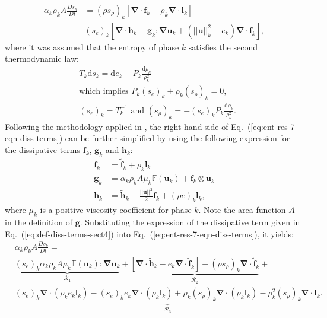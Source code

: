 \documentclass[preprint,10pt]{elsarticle}
\renewcommand{\div}{\mbold{\nabla}\! \cdot \!}
\newcommand{\grad}{\mbold{\nabla}}
\newcommand{\mbold}[1]{\boldsymbol#1}
\newcommand{\eqt}[1]{Eq.~(\ref{#1})}                     %
\begin{document}
%
\begin{align}\label{eq:ent-res-7-eqn-diss-terms}
\alpha_k \rho_k A \frac{Ds_k}{Dt} &=  (\rho s_\rho)_k \left[ \div \mbold f_k - \rho_k \div \mbold l_k \right] + \nonumber \\
&\left(s_e\right)_k \left[ \div \mbold h_k + \mbold g_k : \grad \mbold u_k +  \left( || \mbold u ||^2_k - e_k\right) \div \mbold f_k  \right],
\end{align}
%
where it was assumed that the entropy of phase $k$ satisfies the second thermodynamic law: 
%
\begin{align}\label{eq:2nd-therm-laws-sect4}
&T_k \text{d} s_k = \text{d}e_k - P_k\frac{\text{d}\rho_k}{\rho_k^2} \nonumber \\
& \text{which implies } P_k (s_e)_k + \rho_k (s_\rho)_k = 0, \\
& (s_e)_k = T_k^{-1} \text{ and } (s_\rho)_k = - (s_e)_k P_k \frac{\text{d}\rho_k}{\rho_k^2}. \nonumber
\end{align}
% 
Following the methodology applied in \cite{jlg, Marco_paper_low_mach}, the right-hand side of \eqt{eq:ent-res-7-eqn-diss-terms} can be further simplified by using the following expression
for the dissipative terms $\mbold f_k$,  $\mbold g_k$ and $\mbold h_k$:
%
\begin{subequations}\label{eq:def-diss-terms-sect4}
\begin{align}
  \mbold f_k &= \tilde{\mbold f}_k + \rho_k \mbold  l_k 
  \\
  \mbold g_k &= \alpha_k \rho_k A \mu_k \mathbb{F}(\mbold u_k) + \mbold f_k \otimes \mbold u_k
  \\
  \mbold h_k &= \tilde{\mbold h}_k - \frac{|| \mbold u||^2 }{2} \mbold f_k + (\rho e)_k \mbold l_k,
\end{align}
\end{subequations}
%
where $\mu_k$ is a positive viscosity coefficient for phase $k$. Note the area function $A$ in the definition of $\mbold g$. Substituting the expression of the dissipative term given in \eqt{eq:def-diss-terms-sect4} into \eqt{eq:ent-res-7-eqn-diss-terms}, it yields:
%
\begin{align}\label{eq:ent-res-7-eqn-diss-terms2}
&\alpha_k \rho_k A \frac{Ds_k}{Dt} = \nonumber \\
&\underbrace{\left(s_e\right)_k \alpha_k \rho_k A \mu_k \mathbb{F}(\mbold u_k) : \grad \mbold u_k}_{\mathcal{R}_1} +
\underbrace{\left[ \div \tilde{\mbold h}_k  - e_k \div \tilde{\mbold f}_k  \right] + (\rho s_\rho)_k \div \tilde{\mbold f}_k}_{\mathcal{R}_2} + \nonumber \\
&\underbrace{(s_e)_k \div \left( \rho_k e_k \mbold l_k \right) -  (s_e)_k e_k \div \left( \rho_k \mbold l_k \right) + \rho_k (s_\rho)_k \div \left( \rho_k \mbold l_k \right) 
  - \rho_k^2 (s_\rho)_k \div \mbold l_k}_{\mathcal{R}_3}.
\end{align}
\end{document}
